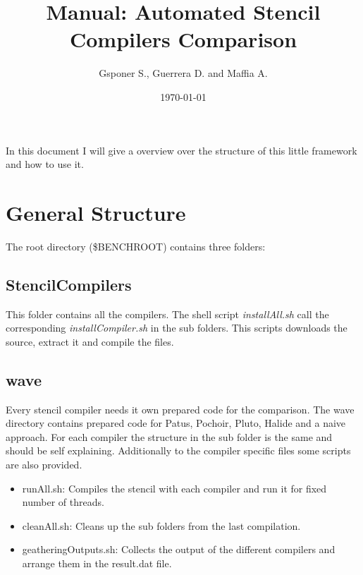 \documentclass[AEJ]{AEA}
\begin{document}
\title{Manual: Automated Stencil Compilers Comparison}
\author{Gsponer S., Guerrera D. and Maffia A.}
\date{\today}


\begin{abstract}

\end{abstract}

\maketitle

In this document I will give a overview over the structure of this little framework and how to use it. 

\section{General Structure}
The root directory (\$BENCHROOT) contains three folders:


\subsection{StencilCompilers}
This folder contains all the compilers. The shell script \emph{installAll.sh} call the corresponding \emph{installCompiler.sh} in the sub folders. This scripts downloads the source, extract it and compile the files.  

\subsection{wave}
Every stencil compiler needs it own prepared code for the comparison. The wave directory contains prepared code for Patus, Pochoir, Pluto, Halide and a naive approach. For each compiler the structure in the sub folder is the same and should be self explaining. Additionally to the compiler specific files some scripts are also provided.\\
\begin{itemize}
	\item runAll.sh: Compiles the stencil with each compiler and run it for fixed number of threads. 
	\item cleanAll.sh: Cleans up the sub folders from the last compilation. 
	\item geatheringOutputs.sh: Collects the output of the different compilers and arrange them in the result.dat file.
\end{itemize}
\end{document}
